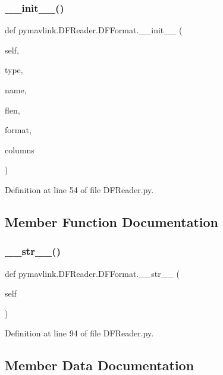 \subsubsection{\texorpdfstring{\_\_init\_\_()}{\_\_init\_\_()}}
{\footnotesize\ttfamily def pymavlink.\+D\+F\+Reader.\+D\+F\+Format.\+\_\+\+\_\+init\+\_\+\+\_\+ (\begin{DoxyParamCaption}\item[{}]{self,  }\item[{}]{type,  }\item[{}]{name,  }\item[{}]{flen,  }\item[{}]{format,  }\item[{}]{columns }\end{DoxyParamCaption})}



Definition at line 54 of file D\+F\+Reader.\+py.



\subsection{Member Function Documentation}
\mbox{\label{classpymavlink_1_1DFReader_1_1DFFormat_a9eb36a2ab990afd802d5088d9af10e96}} 
\subsubsection{\texorpdfstring{\_\_str\_\_()}{\_\_str\_\_()}}
{\footnotesize\ttfamily def pymavlink.\+D\+F\+Reader.\+D\+F\+Format.\+\_\+\+\_\+str\+\_\+\+\_\+ (\begin{DoxyParamCaption}\item[{}]{self }\end{DoxyParamCaption})}



Definition at line 94 of file D\+F\+Reader.\+py.



\subsection{Member Data Documentation}
\mbox{\label{classpymavlink_1_1DFReader_1_1DFFormat_ad31fa0c10cafcc57757c2c5b78217600}} 
